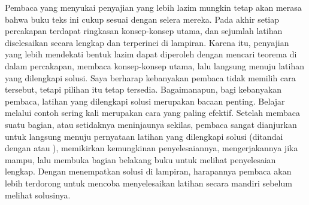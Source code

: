 Pembaca yang menyukai penyajian yang lebih lazim mungkin tetap akan
merasa bahwa buku teks ini cukup sesuai dengan selera mereka. Pada
akhir setiap percakapan terdapat ringkasan konsep-konsep utama, dan
sejumlah latihan diselesaikan secara lengkap dan terperinci di lampiran.
Karena itu, penyajian yang lebih mendekati bentuk lazim dapat diperoleh
dengan mencari teorema di dalam percakapan, membaca konsep-konsep
utama, lalu langsung menuju latihan yang dilengkapi solusi. Saya berharap
kebanyakan pembaca tidak memilih cara tersebut, tetapi pilihan itu
tetap tersedia. Bagaimanapun, bagi kebanyakan pembaca, latihan yang
dilengkapi solusi merupakan bacaan penting. Belajar melalui contoh
sering kali merupakan cara yang paling efektif. Setelah membaca suatu
bagian, atau setidaknya meninjaunya sekilas, pembaca sangat dianjurkan
untuk langsung menuju pernyataan latihan yang dilengkapi solusi (ditandai
dengan  \hasasolution  atau  \haspartwithsolution), memikirkan kemungkinan
penyelesaiannya, mengerjakannya jika mampu, lalu membuka bagian belakang
buku untuk melihat penyelesaian lengkap. Dengan menempatkan solusi
di lampiran, harapannya pembaca akan lebih terdorong untuk mencoba
menyelesaikan latihan secara mandiri sebelum melihat solusinya.

